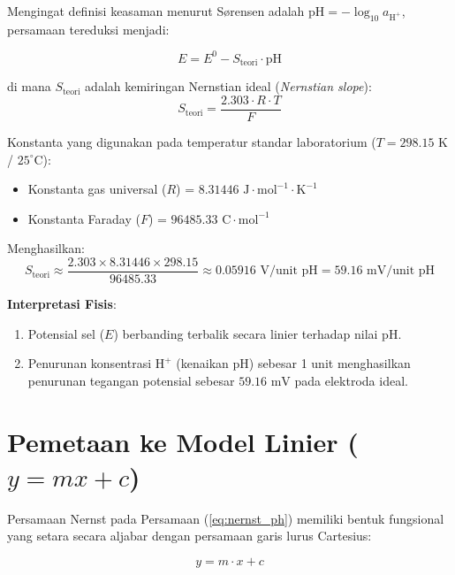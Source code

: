 \documentclass[12pt,a4paper]{article}
\begin{document}
Mengingat definisi keasaman menurut Sørensen adalah $\text{pH} = -\log_{10} a_{\text{H}^+}$, persamaan tereduksi menjadi:

\begin{equation}
\label{eq:nernst_ph}
E = E^0 - S_{\text{teori}} \cdot \text{pH}
\end{equation}

di mana $S_{\text{teori}}$ adalah kemiringan Nernstian ideal (\textit{Nernstian slope}):
\begin{equation}
S_{\text{teori}} = \frac{2.303 \cdot R \cdot T}{F}
\end{equation}

\noindent Konstanta yang digunakan pada temperatur standar laboratorium ($T = 298.15\text{ K}$ / $25^\circ\text{C}$):
\begin{itemize}
    \item Konstanta gas universal ($R$) = $8.31446\text{ J}\cdot\text{mol}^{-1}\cdot\text{K}^{-1}$
    \item Konstanta Faraday ($F$) = $96485.33\text{ C}\cdot\text{mol}^{-1}$
\end{itemize}

\noindent Menghasilkan:
\begin{equation}
S_{\text{teori}} \approx \frac{2.303 \times 8.31446 \times 298.15}{96485.33} \approx 0.05916\text{ V/unit pH} = 59.16\text{ mV/unit pH}
\end{equation}

\noindent \textbf{Interpretasi Fisis}:
\begin{enumerate}
    \item Potensial sel ($E$) berbanding terbalik secara linier terhadap nilai pH.
    \item Penurunan konsentrasi $\text{H}^+$ (kenaikan pH) sebesar 1 unit menghasilkan penurunan tegangan potensial sebesar $59.16\text{ mV}$ pada elektroda ideal.
\end{enumerate}

\section{Pemetaan ke Model Linier ($y = mx + c$)}

Persamaan Nernst pada Persamaan (\ref{eq:nernst_ph}) memiliki bentuk fungsional yang setara secara aljabar dengan persamaan garis lurus Cartesius:

\begin{equation}
\label{eq:garis_lurus}
y = m \cdot x + c
\end{equation}
\end{document}
